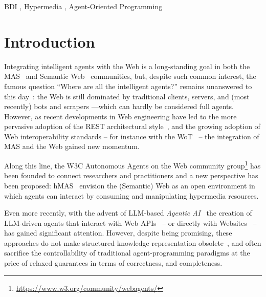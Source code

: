 \documentclass[
]{ceurart}
\begin{document}
\begin{keywords}
  BDI  \sep
  Hypermedia \sep
  Agent-Oriented Programming
\end{keywords}

\maketitle

\section{Introduction}

Integrating intelligent agents with the Web is a long-standing goal
in both the \ac{MAS}~\cite{DBLP:conf/edoc/ShafiqDF06}
and Semantic Web~\cite{lassila2001semantic} communities, but,
despite such common interest,
the famous question
``Where are all the intelligent agents?''
remains unanswered to this day~\cite{hendlerb2007expert}:
the Web is still dominated by traditional clients, servers,
and (most recently) bots and scrapers%
---which can hardly be considered full agents.
%
However,
as recent developments in Web engineering have led to
the more pervasive adoption of the \ac{REST} architectural style~\cite{DBLP:journals/toit/FieldingT02},
and the growing adoption of Web interoperability standards %
-- for instance with the \ac{WoT}~\cite{wotarch} --
the integration of \ac{MAS} and the Web gained new momentum.

Along this line,
the \ac{W3C} Autonomous Agents on the Web community group\footnote{\url{https://www.w3.org/community/webagents/}}
has been founded to connect researchers and practitioners
and a new perspective has been proposed: \ac{hMAS}~\cite{DBLP:conf/atal/CiorteaMGBRZ19}
envision the (Semantic) Web as an open environment in which
agents can interact by consuming and manipulating hypermedia resources.

Even more recently,
with the advent of \ac{LLM}-based \emph{Agentic AI}~\cite{acharya2025access}
the creation of \ac{LLM}-driven agents that interact with Web APIs~\cite{10.5555/3692070.3692540}
-- or directly with Websites~\cite{10.5555/3692070.3694608} --
has gained significant attention.
%
However,
despite being promising,
these approaches
do not make structured knowledge representation obsolete~\cite{pan2024tkde},
and often sacrifice the controllability of traditional agent-programming paradigms
at the price of relaxed guarantees in terms of correctness, and completeness.
\end{document}
